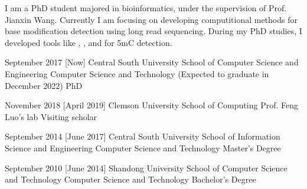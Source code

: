 \documentclass{resume}
\begin{document}
\makeheader

{\onehalfspacing\hspace{2em}%
I am a PhD student majored in bioinformatics, under the supervision of Prof. Jianxin Wang. Currently I am focusing on developing computitional methods for base modification detection using long read sequencing. During my PhD studies, I developed tools like , , and  for 5mC detection.
\par}

\begin{competences}[10em]
\end{competences}

\begin{educations}
  \education%
    {September 2017}%
    [Now]%
    {Central South University}%
    {School of Computer Science and Engineering}%
    {Computer Science and Technology (Expected to graduate in December 2022)}%
    {PhD}

  \separator{0.5ex}
  \education%
    {November 2018}%
    [April 2019]%
    {Clemson University}%
    {School of Computing}%
    {Prof. Feng Luo's lab}%
    {Visiting scholar}

  \separator{0.5ex}
  \education%
    {September 2014}%
    [June 2017]%
    {Central South University}%
    {School of Information Science and Engineering}%
    {Computer Science and Technology}%
    {Master's Degree}

  \separator{0.5ex}
  \education%
    {September 2010}%
    [June 2014]%
    {Shandong University}%
    {School of Computer Science and Technology}%
    {Computer Science and Technology}%
    {Bachelor's Degree}
\end{educations}
\end{document}
